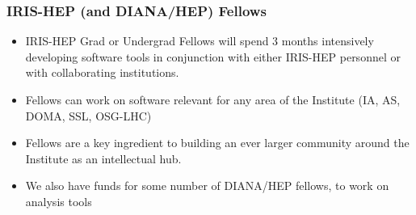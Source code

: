 \begin{frame}
\frametitle{IRIS-HEP (and DIANA/HEP) Fellows}

\begin{itemize}
\item IRIS-HEP Grad or Undergrad Fellows will spend 3 months intensively developing software tools in conjunction with either IRIS-HEP personnel or with collaborating institutions.
\item Fellows can work on software relevant for any area of the Institute (IA, AS, DOMA, SSL, OSG-LHC)
\item Fellows are a key ingredient to building an ever larger community around the Institute as an intellectual hub.
\item We also have funds for some number of DIANA/HEP fellows, to work on analysis tools
\end{itemize}

\end{frame}


